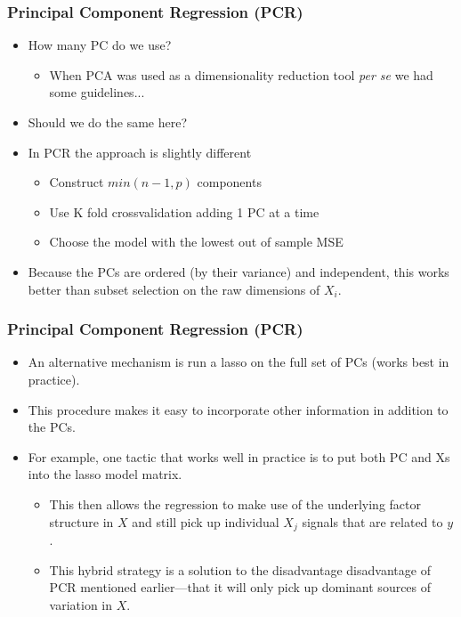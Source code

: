 \documentclass[
  shownotes,
  xcolor={svgnames},
  hyperref={colorlinks,citecolor=DarkBlue,linkcolor=DarkRed,urlcolor=DarkBlue}
  , aspectratio=169]{beamer}
\begin{document}
\begin{frame}[fragile]
\frametitle{ Principal Component Regression (PCR)}


\begin{itemize}
\item How many PC do we use?
\medskip
  \begin{itemize}
    \item When PCA was used as a dimensionality reduction tool {\it per se} we had some guidelines...
  \end{itemize}
\medskip
\item Should we do the same here?
\medskip
\pause
\item In PCR the approach is slightly different
\begin{itemize}

  \item Construct $min(n-1,p)$ components
  \medskip 
  \item Use K fold crossvalidation adding 1 PC at a time
  \medskip
  \item Choose the model with the lowest out of sample MSE
\end{itemize}
\item Because the PCs are ordered (by their variance) and independent, this works better than subset selection on the raw dimensions of $X_i$. 

\end{itemize}

\end{frame}
\begin{frame}[fragile]
\frametitle{ Principal Component Regression (PCR)}


\begin{itemize}
  \item  An alternative mechanism is run a lasso  on the full set of PCs (works best in practice). 
\medskip
\item This procedure makes it easy to incorporate other information in addition to the PCs. 
\medskip
\item For example, one tactic that works well in practice is to put both PC and Xs into the lasso model matrix. 
  \begin{itemize}
    \medskip
    \item This then allows the regression to make use of the underlying factor structure in $X$ and still pick up individual $X_j$ signals that are related to $y$. 
    \medskip
    \item This hybrid strategy is a solution to the disadvantage disadvantage of PCR mentioned earlier—that it will only pick up dominant sources of variation in $X$. 
  \end{itemize}


\end{itemize}

\end{frame}
\end{document}

